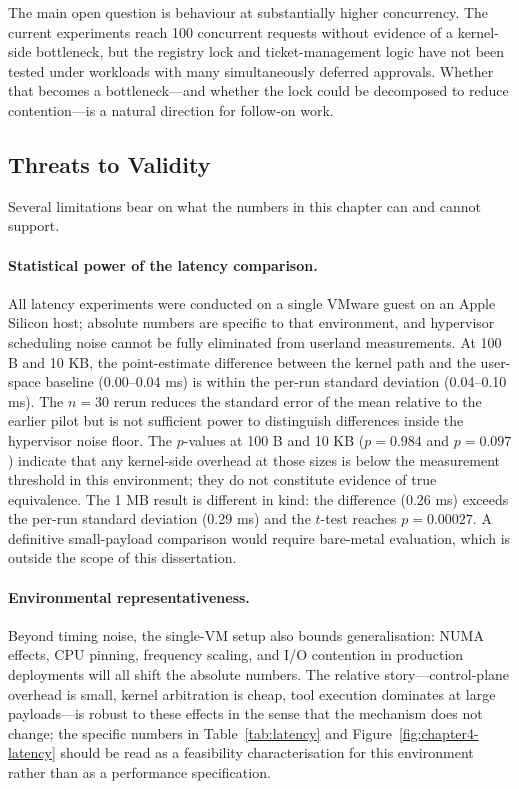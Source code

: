 The main open question is behaviour at substantially higher concurrency. The current experiments reach 100 concurrent requests without evidence of a kernel-side bottleneck, but the registry lock and ticket-management logic have not been tested under workloads with many simultaneously deferred approvals. Whether that becomes a bottleneck---and whether the lock could be decomposed to reduce contention---is a natural direction for follow-on work.


\subsection{Threats to Validity}

Several limitations bear on what the numbers in this chapter can and cannot support.

\paragraph{Statistical power of the latency comparison.} All latency experiments were conducted on a single VMware guest on an Apple Silicon host; absolute numbers are specific to that environment, and hypervisor scheduling noise cannot be fully eliminated from userland measurements. At 100 B and 10 KB, the point-estimate difference between the kernel path and the user-space baseline (\num{0.00}--\num{0.04} ms) is within the per-run standard deviation (\num{0.04}--\num{0.10} ms). The $n = 30$ rerun reduces the standard error of the mean relative to the earlier pilot but is not sufficient power to distinguish differences inside the hypervisor noise floor. The $p$-values at 100 B and 10 KB ($p = 0.984$ and $p = 0.097$) indicate that any kernel-side overhead at those sizes is below the measurement threshold in this environment; they do not constitute evidence of true equivalence. The 1 MB result is different in kind: the difference (\num{0.26} ms) exceeds the per-run standard deviation (\num{0.29} ms) and the $t$-test reaches $p = 0.00027$. A definitive small-payload comparison would require bare-metal evaluation, which is outside the scope of this dissertation.

\paragraph{Environmental representativeness.} Beyond timing noise, the single-VM setup also bounds generalisation: NUMA effects, CPU pinning, frequency scaling, and I/O contention in production deployments will all shift the absolute numbers. The relative story---control-plane overhead is small, kernel arbitration is cheap, tool execution dominates at large payloads---is robust to these effects in the sense that the mechanism does not change; the specific numbers in Table~\ref{tab:latency} and Figure~\ref{fig:chapter4-latency} should be read as a feasibility characterisation for this environment rather than as a performance specification.

